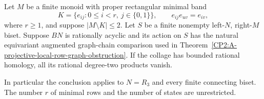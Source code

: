 \begin{theorem}
\label{CP2:A-two-column-two-outside-graph}
Let $M$ be a finite monoid with proper rectangular minimal band
\[
 K=\{e_{ij}:0\le i<r,\ j\in\{0,1\}\},\qquad
 e_{ij}e_{uv}=e_{iv},
\]
where $r\ge1$, and suppose $|M\setminus K|\le2$.
Let $S$ be a finite nonempty left-$N$, right-$M$ biset.
Suppose $BN$ is rationally acyclic and its action on $S$ has the
natural equivariant augmented graph-chain comparison used in
Theorem~\ref{CP2:A-projective-local-row-graph-obstruction}.
If the collage has bounded rational homology, all its rational
degree-two products vanish.

In particular the conclusion applies to $N=R_3$ and every finite
connecting biset.  The number $r$ of minimal rows and the number of
states are unrestricted.
\end{theorem}
